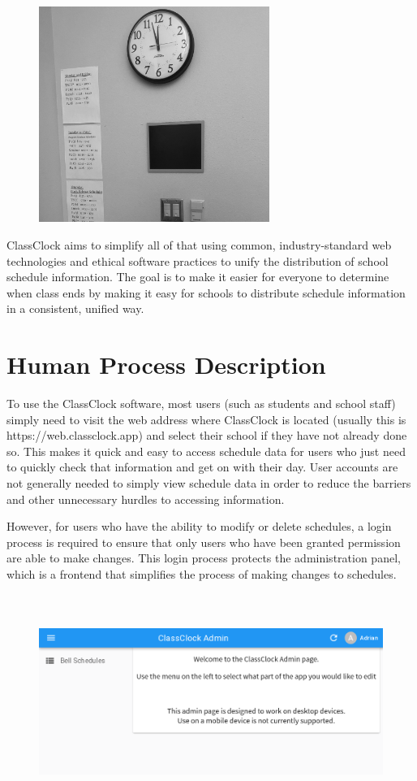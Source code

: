 \documentclass{article}
\begin{document}
\begin{figure}
\includegraphics[width=2.9547in,height=2.7646in]{Mini20Manual-img003.jpg}\end{figure}
{ClassClock aims to simplify all of that using common, industry-standard web technologies and ethical software practices
to unify the distribution of school schedule information. The goal is to make it easier for everyone to determine when
class ends by making it easy for schools to distribute schedule information in a consistent, unified way.}

\section{Human Process Description}
{To use the ClassClock software, most users (such as students and school staff) simply need to visit the web address
where ClassClock is located (usually this is https://web.classclock.app) and select their school if they have not
already done so. This makes it quick and easy to access schedule data for users who just need to quickly check that
information and get on with their day. User accounts are not generally needed to simply view schedule data in order to
reduce the barriers and other unnecessary hurdles to accessing information.}

{However, for users who have the ability to modify or delete schedules, a login process is required to ensure that only
users who have been granted permission are able to make changes. This login process protects the administration panel,
which is a frontend that simplifies the process of making changes to schedules.}



\begin{figure}
\includegraphics[width=6.5in,height=2.7626in]{Mini20Manual-img004.png}\end{figure}
\end{document}
